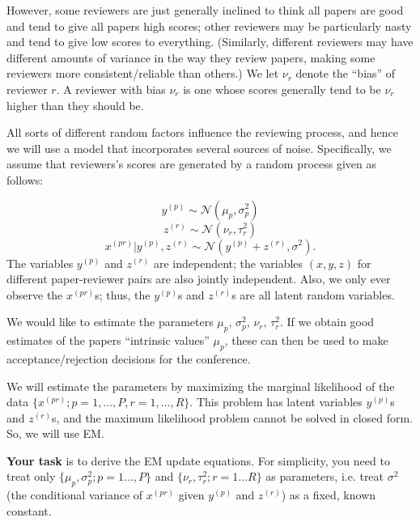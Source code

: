 \documentclass[twoside,12pt]{article}
\begin{document}
However, some reviewers are just generally inclined to think all papers are good and tend to give all papers high scores; other reviewers may be particularly nasty and tend to give low scores to everything. (Similarly, different reviewers may have different amounts of variance in the way they review papers, making some reviewers more consistent/reliable than others.) We let $\nu_r$ denote the ``bias'' of reviewer $r$. A reviewer with bias $\nu_r$ is one whose scores generally tend to be $\nu_r$ higher than they should be.

All sorts of different random factors influence the reviewing process, and hence we will use a model that incorporates several sources of noise. Specifically, we assume that reviewers's scores are generated by a random process given as follows:

\[
y^{(p)} \sim \mathcal{N}(\mu_p, \sigma_p^2)
\]
\[
z^{(r)} \sim \mathcal{N}(\nu_r, \tau_r^2)
\]
\[
x^{(pr)}|y^{(p)}, z^{(r)} \sim\mathcal{N}(y^{(p)}+ z^{(r)}, \sigma^2).
\]
The variables $y^{(p)}$ and $z^{(r)}$ are independent; the variables $(x,y,z)$ for different paper-reviewer pairs are also jointly independent. Also, we only ever observe the $x^{(pr)}$s; thus, the $y^{(p)}$s and $z^{(r)}$s are all latent random variables.
 
We would like to estimate the parameters $\mu_p$, $\sigma_p^2$, $\nu_r$, $\tau_r^2$. If we obtain good estimates of the papers ``intrinsic values'' $\mu_p$, these can then be used to make acceptance/rejection decisions for the conference. 

We will estimate the parameters by maximizing the marginal likelihood of the data $\{x^{(pr)}; p = 1,\ldots,P,r = 1,\ldots,R\}$. This problem has latent variables $y^{(p)}$s and $z^{(r)}$s, and the maximum likelihood problem cannot be solved in closed form. So, we will use EM. 

{\bf Your task} is to derive the EM update equations. For simplicity, you need to treat only $\{\mu_p,\sigma_p^2; p = 1\ldots,P\}$ and $\{\nu_r,\tau_r^2;r = 1...R\}$ as parameters, i.e. treat $\sigma^2$ (the conditional variance of $x^{(pr)}$ given $y^{(p)}$ and $z^{(r)}$) as a fixed, known constant.
\end{document}
